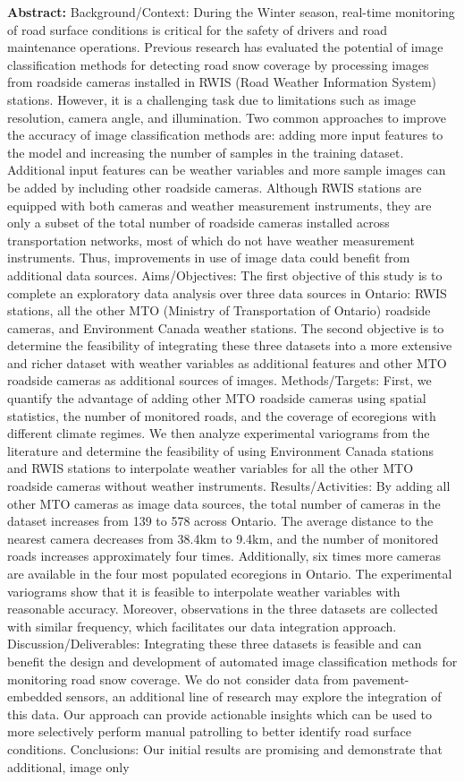 \documentclass{article}
\begin{document}
\textbf{Abstract:} Background/Context: During the Winter season, real-time monitoring of road surface conditions is critical for the safety of drivers and road maintenance operations. Previous research has evaluated the potential of image classification methods for detecting road snow coverage by processing images from roadside cameras installed in RWIS (Road Weather Information System) stations. However, it is a challenging task due to limitations such as image resolution, camera angle, and illumination. Two common approaches to improve the accuracy of image classification methods are: adding more input features to the model and increasing the number of samples in the training dataset. Additional input features can be weather variables and more sample images can be added by including other roadside cameras. Although RWIS stations are equipped with both cameras and weather measurement instruments, they are only a subset of the total number of roadside cameras installed across transportation networks, most of which do not have weather measurement instruments. Thus, improvements in use of image data could benefit from additional data sources. Aims/Objectives: The first objective of this study is to complete an exploratory data analysis over three data sources in Ontario: RWIS stations, all the other MTO (Ministry of Transportation of Ontario) roadside cameras, and Environment Canada weather stations. The second objective is to determine the feasibility of integrating these three datasets into a more extensive and richer dataset with weather variables as additional features and other MTO roadside cameras as additional sources of images. Methods/Targets: First, we quantify the advantage of adding other MTO roadside cameras using spatial statistics, the number of monitored roads, and the coverage of ecoregions with different climate regimes. We then analyze experimental variograms from the literature and determine the feasibility of using Environment Canada stations and RWIS stations to interpolate weather variables for all the other MTO roadside cameras without weather instruments. Results/Activities: By adding all other MTO cameras as image data sources, the total number of cameras in the dataset increases from 139 to 578 across Ontario. The average distance to the nearest camera decreases from 38.4km to 9.4km, and the number of monitored roads increases approximately four times. Additionally, six times more cameras are available in the four most populated ecoregions in Ontario. The experimental variograms show that it is feasible to interpolate weather variables with reasonable accuracy. Moreover, observations in the three datasets are collected with similar frequency, which facilitates our data integration approach. Discussion/Deliverables: Integrating these three datasets is feasible and can benefit the design and development of automated image classification methods for monitoring road snow coverage. We do not consider data from pavement-embedded sensors, an additional line of research may explore the integration of this data. Our approach can provide actionable insights which can be used to more selectively perform manual patrolling to better identify road surface conditions. Conclusions: Our initial results are promising and demonstrate that additional, image only 
\end{document}

